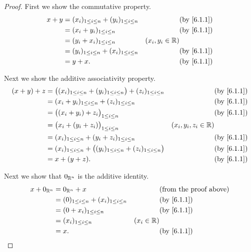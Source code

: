 \begin{proof}
  First we show the commutative property.
  \begin{align*}
    x + y & = (x_i)_{1 \leq i \leq n} + (y_i)_{1 \leq i \leq n} &                   & \by{6.1.1} \\
          & = (x_i + y_i)_{1 \leq i \leq n}                     &                   & \by{6.1.1} \\
          & = (y_i + x_i)_{1 \leq i \leq n}                     & (x_i, y_i \in \R)              \\
          & = (y_i)_{1 \leq i \leq n} + (x_i)_{1 \leq i \leq n} &                   & \by{6.1.1} \\
          & = y + x.                                            &                   & \by{6.1.1}
  \end{align*}

  Next we show the additive associativity property.
  \begin{align*}
    (x + y) + z & = \big((x_i)_{1 \leq i \leq n} + (y_i)_{1 \leq i \leq n}\big) + (z_i)_{1 \leq i \leq n} &                        & \by{6.1.1} \\
                & = (x_i + y_i)_{1 \leq i \leq n} + (z_i)_{1 \leq i \leq n}                               &                        & \by{6.1.1} \\
                & = \big((x_i + y_i) + z_i\big)_{1 \leq i \leq n}                                         &                        & \by{6.1.1} \\
                & = \big(x_i + (y_i + z_i)\big)_{1 \leq i \leq n}                                         & (x_i, y_i, z_i \in \R)              \\
                & = (x_i)_{1 \leq i \leq n} + (y_i + z_i)_{1 \leq i \leq n}                               &                        & \by{6.1.1} \\
                & = (x_i)_{1 \leq i \leq n} + \big((y_i)_{1 \leq i \leq n} + (z_i)_{1 \leq i \leq n}\big) &                        & \by{6.1.1} \\
                & = x + (y + z).                                                                          &                        & \by{6.1.1}
  \end{align*}

  Next we show that \(0_{\mathbb{R}^n}\) is the additive identity.
  \begin{align*}
    x + 0_{\R^n} & = 0_{\R^n} + x                                    &              & \text{(from the proof above)} \\
                 & = (0)_{1 \leq i \leq n} + (x_i)_{1 \leq i \leq n} &              & \by{6.1.1}                    \\
                 & = (0 + x_i)_{1 \leq i \leq n}                     &              & \by{6.1.1}                    \\
                 & = (x_i)_{1 \leq i \leq n}                         & (x_i \in \R)                                 \\
                 & = x.                                              &              & \by{6.1.1}
  \end{align*}


\end{proof}
